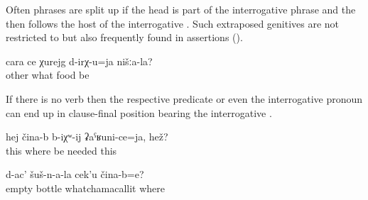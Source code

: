Often  phrases are split up if the head is part of the interrogative phrase and the  then follows the host of the interrogative  . Such extraposed genitives are not restricted to  but also frequently found in assertions (). 
%
\begin{exe}
	\ex	\label{ex:‎What other dishes do we have}
	\gll	cara	ce	χurejg	d-irχ-u=ja	nišːa-la?\\
		other	what	food	be	\\
	\glt	{}
\end{exe}

If there is no verb then the respective predicate or even the interrogative pronoun can end up in clause-final position bearing the interrogative .
%
\begin{exe}
	\ex	\label{ex:‎This where should it be}
	\gll	hej	čina-b	b-iχʷ-ij	ʡaˁʁuni-ce=ja,	hež?\\
		this	where	be	needed	this\\
	\glt	{}

	\ex	\label{ex:‎Where is this (picture) of the empty bottles}
	\gll	d-ac'	šuš-n-a-la	cek'u	čina-b=e?\\
		empty	bottle	whatchamacallit	where\\
	\glt	{}
\end{exe}

